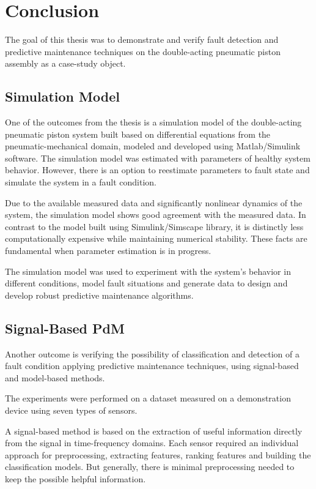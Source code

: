\chapter{Conclusion}
The goal of this thesis was to demonstrate and verify fault detection and
predictive maintenance techniques on the double-acting pneumatic piston
assembly as a case-study object.

\section{Simulation Model}

One of the outcomes from the thesis is a simulation model of the
double-acting pneumatic piston system built based on differential equations
from the pneumatic-mechanical domain, modeled and developed using
Matlab/Simulink software. The simulation model was estimated with
parameters of healthy system behavior. However, there is an option to
reestimate parameters to fault state and simulate the system in a fault
condition. 

Due to the available measured data and significantly nonlinear dynamics of
the system, the simulation model shows good agreement with the measured
data. In contrast to the model built using Simulink/Simscape library, it is
distinctly less computationally expensive while maintaining numerical
stability. These facts are fundamental when parameter estimation is in
progress.

The simulation model was used to experiment with the system's behavior in
different conditions, model fault situations and generate data to design
and develop robust predictive maintenance algorithms. 


\section{Signal-Based PdM}
Another outcome is verifying the possibility of classification and
detection of a fault condition applying predictive maintenance techniques,
using signal-based and model-based methods.
 
The experiments were performed on a dataset measured on a demonstration
device using seven types of sensors.
  
A signal-based method is based on the extraction of useful information
directly from the signal in time-frequency domains. Each sensor required an
individual approach for preprocessing, extracting features, ranking
features and building the classification models. But generally, there is
minimal preprocessing needed to keep the possible helpful information. 

